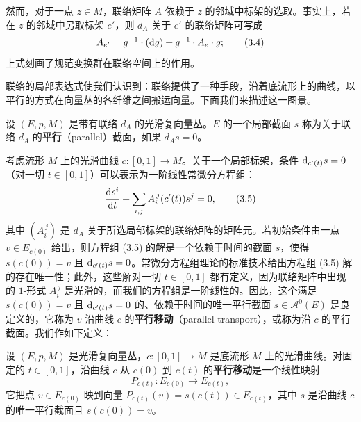 然而，对于一点 $z\in M$，联络矩阵 $A$ 依赖于 $z$ 的邻域中标架的选取。事实上，若在 $z$ 的邻域中另取标架 $e'$，则 $d_A$ 关于 $e'$ 的联络矩阵可写成
\begin{equation}
A_{e'}=g^{-1}\cdot(\mathrm{d} g)+g^{-1}\cdot A_e\cdot g ; \tag{3.4}
\end{equation}
上式刻画了规范变换群在联络空间上的作用。

联络的局部表达式使我们认识到：联络提供了一种手段，沿着底流形上的曲线，以平行的方式在向量丛的各纤维之间搬运向量。下面我们来描述这一图景。

\begin{definition}[3.18]
设 $(E,p,M)$ 是带有联络 $d_A$ 的光滑复向量丛。$E$ 的一个局部截面 $s$ 称为关于联络 $d_A$ 的\textbf{平行}（parallel）截面，如果 $d_As=0$。
\end{definition}

考虑流形 $M$ 上的光滑曲线 $c\colon[0,1]\to M$。关于一个局部标架，条件 $\mathrm{d}_{c'(t)}s=0$（对一切 $t\in[0,1]$）可以表示为一阶线性常微分方程组：
\begin{equation}
\frac{\mathrm{d} s^i}{\mathrm{d} t}+\sum_{i,j}A_i^{\,j}(c'(t))s^j=0 , \tag{3.5}
\end{equation}
其中 $(A_i^{\,j})$ 是 $d_A$ 关于所选局部标架的联络矩阵的矩阵元。若初始条件由一点 $v\in E_{c(0)}$ 给出，则方程组 (3.5) 的解是一个依赖于时间的截面 $s$，使得 $s(c(0))=v$ 且 $\mathrm{d}_{c'(t)}s=0$。常微分方程组理论的标准技术给出方程组 (3.5) 解的存在唯一性；此外，这些解对一切 $t\in[0,1]$ 都有定义，因为联络矩阵中出现的 $1$-形式 $A_i^{\,j}$ 是光滑的，而我们的方程组是一阶线性的。因此，这个满足 $s(c(0))=v$ 且 $\mathrm{d}_{c'(t)}s=0$ 的、依赖于时间的唯一平行截面 $s\in\mathcal{A}^0(E)$ 是良定义的，它称为 $v$ 沿曲线 $c$ 的\textbf{平行移动}（parallel transport），或称为沿 $c$ 的平行截面。我们作如下定义：

\begin{definition}[3.19]
设 $(E,p,M)$ 是光滑复向量丛，$c\colon[0,1]\to M$ 是底流形 $M$ 上的光滑曲线。对固定的 $t\in[0,1]$，沿曲线 $c$ 从 $c(0)$ 到 $c(t)$ 的\textbf{平行移动}是一个线性映射
\[
P_{c(t)}\colon E_{c(0)}\to E_{c(t)} ,
\]
它把点 $v\in E_{c(0)}$ 映到向量 $P_{c(t)}(v)=s(c(t))\in E_{c(t)}$，其中 $s$ 是沿曲线 $c$ 的唯一平行截面且 $s(c(0))=v$。
\end{definition}

